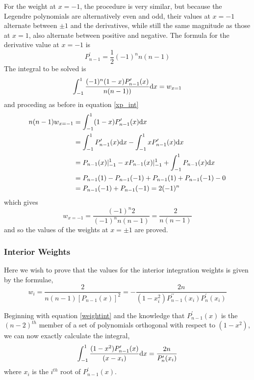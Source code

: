 \documentclass[preprint]{revtex4}
\newcommand{\dx}{{\rm d}x}
\newcommand{\intunit}{\ensuremath{\int_{-1}^{1}}}
\begin{document}
For the weight at $x=-1$, the procedure is very similar, but because the Legendre
polynomials are alternatively even and odd, their values at $x=-1$ alternate 
between $\pm1$ and the derivatives, while still the same magnitude as those
at $x=1$, also alternate between positive and negative.  
The formula for the derivative value at $x=-1$ is 
\begin{equation}
\label{w_xn_1}
P^\prime_{n-1}=\frac{1}{2}(-1)^nn(n-1)
\end{equation}
The integral to be solved is
\begin{equation}
\label{w_xn_2}
\intunit \frac{(-1)^n(1-x)P^\prime_{n-1}(x)}{n(n-1))}\dx = w_{x=1}
\end{equation}
and proceding as before in equation \ref{xp_int}
\begin{align}
n(n-1)w_{x=-1} &= \intunit (1-x)P^\prime_{n-1}(x)\dx \nonumber \\
&= \intunit P^\prime_{n-1}(x)\dx - \intunit xP^\prime_{n-1}(x)\dx \nonumber \\
&= P_{n-1}(x)\vert^1_{-1} - xP_{n-1}(x) \vert^1_{-1} + \intunit P_{n-1}(x)\dx \nonumber \\
&= P_{n-1}(1)-P_{n-1}(-1)+P_{n-1}(1)+P_{n-1}(-1) - 0 \nonumber \\
&= P_{n-1}(-1)+P_{n-1}(-1) = 2(-1)^n
\label{xn_int}
\end{align}
which gives
\begin{equation}
w_{x=-1}=\frac{(-1)^n2}{(-1)^nn(n-1)} = \frac{2}{n(n-1)}
\end{equation}
and so the values of the weights at $x=\pm1$ are proved.


\subsubsection{Interior Weights}
Here we wish to prove that the values for the interior integration weights is given 
by the formulae, 
\begin{equation}
\label{weightform2}
w_i=\frac{2}{n(n-1)[P_{n-1}(x)]^2} = -\frac{2n}{(1-x_i^2)P_{n-1}^{\prime\prime}(x_i)P_n^\prime(x_i)}
\end{equation}

Beginning with equation \ref{weightint} and the knowledge that $P_{n-1}^\prime(x)$ is
the $(n-2)^{th}$ member of a set of polynomials orthogonal with respect to $(1-x^2)$, 
we can now exactly calculate the integral, 
\begin{equation}
\label{pint}
\intunit \frac{(1-x^2)P^\prime_{n-1}(x)}{(x-x_i)}\dx = \frac{2n}{P^\prime_n(x_i)} \nonumber
\end{equation}
where $x_i$ is the $i^{th}$ root of $P^\prime_{n-1}(x)$.
\end{document}
